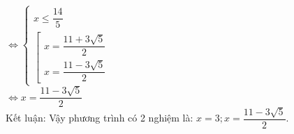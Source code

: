 $ \Leftrightarrow \begin{cases}
     x \leq \dfrac{14}{5} \\
     \left[
         \begin{array}{l}
             x = \dfrac{11+3 \sqrt{5}}{2} \\
             x = \dfrac{11-3 \sqrt{5}}{2} 
         \end{array}
     \right. 
     
\end{cases} $ \\ 
$ \Leftrightarrow 
             x = \dfrac{11-3 \sqrt{5}}{2}  $ \\ 

Kết luận: Vậy phương trình có 2 nghiệm là: $ x=3 ;  x = \dfrac{11-3 \sqrt{5}}{2}   $.

